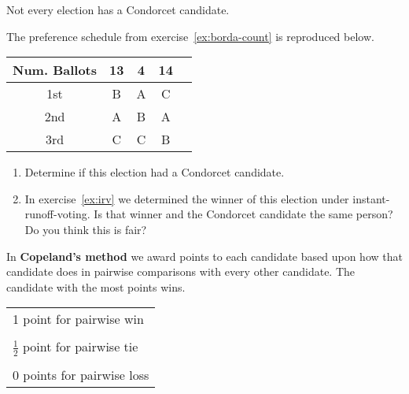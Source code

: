 \begin{note}
  Not every election has a Condorcet candidate.
\end{note}

\begin{exercise}\label{ex:copeland}
  The preference schedule from exercise~\ref{ex:borda-count} is
  reproduced below.
  \begin{center}
    \begin{tabular}{ccccc}
      \toprule
      Num. Ballots & 13 & 4 & 14 \\
      \midrule
      1st & B & A & C \\
      2nd & A & B & A \\
      3rd & C & C & B \\
      \bottomrule
    \end{tabular}
  \end{center}

  \begin{enumerate}
  \item Determine if this election had a Condorcet candidate.


  \item In exercise~\ref{ex:irv} we determined the winner of this
    election under instant-runoff-voting. Is that winner and the
    Condorcet candidate the same person? Do you think this is fair?

  \end{enumerate}
\end{exercise}

\newpage

\begin{definition}
  In \textbf{Copeland's method} we award points to each candidate
  based upon how that candidate does in pairwise comparisons with
  every other candidate. The candidate with the most points wins.
  \begin{center}
    \begin{tabular}[h]{l}
      \toprule
      1 point for pairwise win \\ \\
      \(\tfrac{1}{2}\) point for pairwise tie \\ \\
      0 points for pairwise loss \\
      \bottomrule
    \end{tabular}
  \end{center}
\end{definition}

